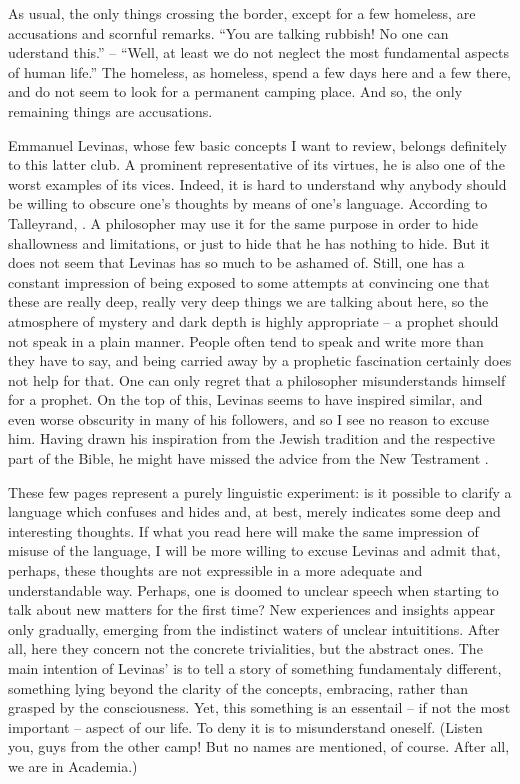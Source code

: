 As usual, the only things crossing the border, except for a few homeless, are accusations and
scornful remarks. ``You are talking rubbish! No one can uderstand this.'' -- ``Well, at least we do not neglect the
most fundamental aspects of human life.'' The homeless, as homeless, spend a few days here
and a few there, and do not seem to look for a permanent camping place. And so, the only 
remaining things are accusations.

Emmanuel Levinas, whose few basic concepts I want to review, belongs definitely to this 
latter club. A prominent representative of its virtues, he is also one of the worst examples
of its vices. Indeed, it is hard to understand why anybody should be
willing to obscure one's thoughts by means of one's language.
According to Talleyrand, .
A philosopher may  use
it for the same purpose in order to hide shallowness and limitations, or just to hide
that he has nothing to hide. But it does not seem that Levinas has so much to be ashamed of.
Still, one has a constant impression of being exposed to some
attempts at convincing one that these are really deep, really very deep things we are
talking about here, so the atmosphere of mystery and dark depth is highly appropriate -- 
a prophet should not speak in a plain manner. 
People often tend to speak and write more than they have to say, and being carried away by
a prophetic fascination certainly does not help for that.
One can only regret that a philosopher 
misunderstands himself for a prophet. On the top of this, Levinas seems to have inspired 
similar, and even worse obscurity in many of his followers, and so I see no reason to 
excuse him. 
Having drawn his inspiration from the Jewish tradition and the respective part of the 
Bible, he might have missed the advice from the New Testrament 
.

These few pages represent a purely linguistic experiment: is it possible to 
clarify a language which confuses and hides and, at best, merely indicates
some deep and interesting thoughts.
If what you read here will make the same impression of misuse of the
language, I will be more willing to excuse Levinas and admit that, perhaps, these thoughts 
are not expressible in a more adequate and understandable way. 
Perhaps, one is doomed to unclear speech when starting to talk about new
matters for the first time? 
New experiences and insights appear only gradually, emerging from the indistinct waters of
unclear intuititions. 
After all, here they concern not the concrete trivialities, but the abstract ones. 
The main intention of Levinas' is to tell a story of 
something fundamentaly different, something lying beyond the clarity of the concepts, embracing,
rather than grasped by the consciousness. Yet, this something is an essentail -- if not the 
most important -- aspect of our life. To deny it is to misunderstand oneself. 
(Listen you, guys from the other camp! But no names are mentioned, of course. 
After all, we are in Academia.)

